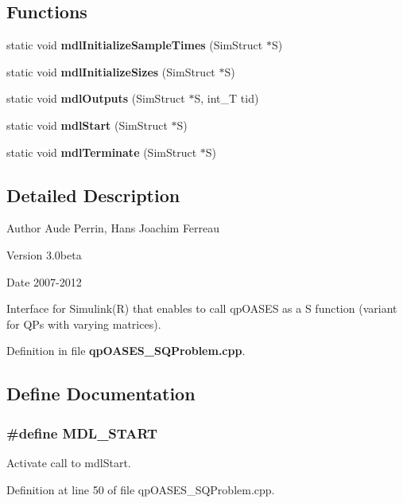 \subsection*{Functions}
\begin{DoxyCompactItemize}
\item 
static void {\bf mdlInitializeSampleTimes} (SimStruct $\ast$S)
\item 
static void {\bf mdlInitializeSizes} (SimStruct $\ast$S)
\item 
static void {\bf mdlOutputs} (SimStruct $\ast$S, int\_\-T tid)
\item 
static void {\bf mdlStart} (SimStruct $\ast$S)
\item 
static void {\bf mdlTerminate} (SimStruct $\ast$S)
\end{DoxyCompactItemize}


\subsection{Detailed Description}
\begin{DoxyAuthor}{Author}
Aude Perrin, Hans Joachim Ferreau 
\end{DoxyAuthor}
\begin{DoxyVersion}{Version}
3.0beta 
\end{DoxyVersion}
\begin{DoxyDate}{Date}
2007-\/2012
\end{DoxyDate}
Interface for Simulink(R) that enables to call qpOASES as a S function (variant for QPs with varying matrices). 

Definition in file {\bf qpOASES\_\-SQProblem.cpp}.



\subsection{Define Documentation}
\subsubsection[{MDL\_\-START}]{\setlength{\rightskip}{0pt plus 5cm}\#define MDL\_\-START}\label{qpOASES__SQProblem_8cpp_ac032abbf580c891fb0c11e63e9bc668a}
Activate call to mdlStart. 

Definition at line 50 of file qpOASES\_\-SQProblem.cpp.

